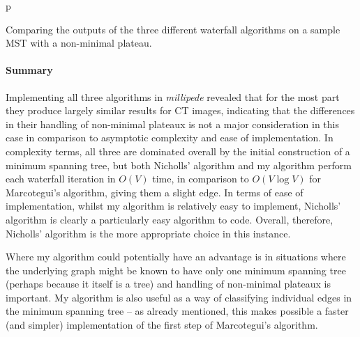 \begin{stusubfig}{p}
	\hspace{4mm}%
\caption{Comparing the outputs of the three different waterfall algorithms on a sample MST with a non-minimal plateau.}
\label{fig:segmentation-waterfall-comparison}
\end{stusubfig}

\paragraph{Summary}

Implementing all three algorithms in \emph{millipede} revealed that for the most part they produce largely similar results for CT images, indicating that the differences in their handling of non-minimal plateaux is not a major consideration in this case in comparison to asymptotic complexity and ease of implementation. In complexity terms, all three are dominated overall by the initial construction of a minimum spanning tree, but both Nicholls' algorithm and my algorithm perform each waterfall iteration in $O(V)$ time, in comparison to $O(V \log V)$ for Marcotegui's algorithm, giving them a slight edge. In terms of ease of implementation, whilst my algorithm is relatively easy to implement, Nicholls' algorithm is clearly a particularly easy algorithm to code. Overall, therefore, Nicholls' algorithm is the more appropriate choice in this instance.

Where my algorithm could potentially have an advantage is in situations where the underlying graph might be known to have only one minimum spanning tree (perhaps because it itself is a tree) and handling of non-minimal plateaux is important. My algorithm is also useful as a way of classifying individual edges in the minimum spanning tree -- as already mentioned, this makes possible a faster (and simpler) implementation of the first step of Marcotegui's algorithm.

